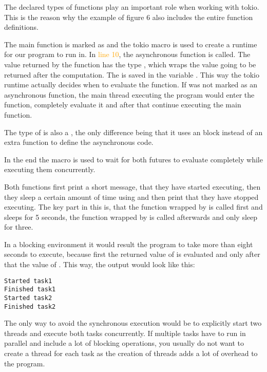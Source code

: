 The declared types of functions play an important role when working with tokio. This is the reason why the example
of figure 6 also includes the entire function definitions.

The main function is marked as  and the tokio macro is used to create a runtime for our program to run in.
In \textcolor{orange}{line 10}, the asynchronous function  is called. The value returned by the
function has the type , which wraps the value going to be returned after the computation. The
 is saved in the variable . This way the tokio runtime actually decides when to evaluate the
function. If  was not marked as an asynchronous function, the main thread executing the program
would enter the function, completely evaluate it and after that continue executing the main function.

The type of  is also a , the only difference being that it uses an  block
instead of an extra function to define the asynchronous code.

In the end the macro  is used to wait for both futures to evaluate completely while executing them
concurrently.

Both functions first print a short message, that they have started executing, then they sleep a certain amount of time
using  and then print that they have stopped executing. The key part in this is, that the
function wrapped by  is called first and sleeps for 5 seconds, the function wrapped by  is
called afterwards and only sleep for three.

In a blocking environment it would result the program to take more than eight seconds to execute, because first the
returned value of  is evaluated and only after that the value of . This way, the output
would look like this:

\begin{verbatim}
Started task1
Finished task1
Started task2
Finished task2
\end{verbatim}

The only way to avoid the synchronous execution would be to explicitly start two threads and execute both tasks
concurrently. If multiple tasks have to run in parallel and include a lot of blocking operations, you usually do not
want to create a thread for each task as the creation of threads adds a lot of overhead to the program.

